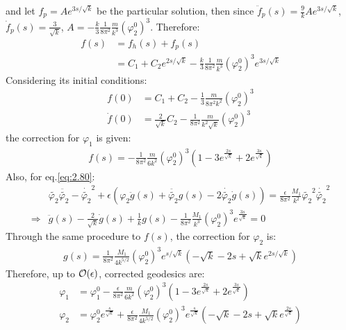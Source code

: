 and let $f_{p} = A e^{3s/ \sqrt{k}}$ be the particular solution, then since $\ddot f_{p} (s) = \frac{9}{k} Ae^{3s/\sqrt{k}}$, $\dot f_{p} (s) = \frac{3}{\sqrt{k}}$, $A = -\frac{k}{3} \frac{1}{8\pi^{2}}\frac{m}{k^{3}} (\varphi_{2}^{0})^{3}$. Therefore:
\begin{align}
    f(s) &= f_{h}(s) + f_{p}(s) \nonumber \\
    &= C_{1} + C_{2} e^{2s/\sqrt{k}} - \frac{k}{3}\frac{1}{8\pi^{2}}\frac{m}{k^{3}}(\varphi_{2}^{0})^{3} e^{3s/\sqrt{k}}
\end{align}
Considering its initial conditions:
\begin{align}
    f(0) &= C_{1} + C_{2} - \frac{1}{3}\frac{m}{8\pi^{2}k^{2}}(\varphi_{2}^{0})^{3} \\
    \dot{f}(0) &= \frac{2}{\sqrt{k}}C_{2} -  \frac{1}{8\pi^{2}}\frac{m}{k^{2}\sqrt{k}}(\varphi_{2}^{0})^{3}
\end{align}
the correction for $\varphi_{1}$ is given:
\begin{align}
    f(s) = -\frac{1}{8\pi^{2}}\frac{m}{6k^{2}}(\varphi_{2}^{0})^{3}(1-3e^{\frac{2s}{\sqrt{k}}} + 2e^{\frac{3s}{\sqrt{k}}})
\end{align}
Also, for eq.\ref{eq:2.80}:
\begin{align}
    &\tilde{\varphi_{2}}\ddot{\tilde{\varphi_{2}}} -\dot{\tilde{\varphi_{2}}}^{2} + \epsilon(\varphi_{2}\ddot{g}(s) + \ddot{\tilde{\varphi_{2}}} g(s) - 2\dot{\tilde{\varphi_{2}}}\dot{g}(s)) = \frac{\epsilon}{8\pi^{2}}\frac{M_1}{k^2} \tilde{\varphi_{2}}^2 \dot{\tilde{\varphi_{2}}}^2 \\
    \Rightarrow & \ddot{g}(s) - \frac{2}{\sqrt{k}} \dot{g}(s) +\frac{1}{k}g(s) - \frac{1}{8\pi^{2}}\frac{M_{1}}{k^3} (\varphi_{2}^{0})^{3} e^{\frac{3s}{\sqrt{k}} }= 0
\end{align}
Through the same procedure to $f(s)$, the correction for $\varphi_{2}$ is:
\begin{align}
    g(s) = \frac{1}{8\pi^{2}} \frac{M_{1}}{4k^{5/2}}(\varphi_{2}^{0})^{3}e^{s/\sqrt{k}} (-\sqrt{k} - 2s +\sqrt{k} e^{2s/\sqrt{k}})
\end{align}
Therefore, up to $\order {\epsilon}$, corrected geodesics are:
\begin{align}[left=\empheqlbrace]
    \varphi_{1} &= \varphi_{1}^{0} - \frac{\epsilon}{8\pi^2} \frac{m}{6k^{2}} (\varphi_{2}^{0})^{3} (1-3e^{\frac{2s}{\sqrt{k}}} + 2e^{\frac{3s}{\sqrt{k}}}) \\
     \varphi_{2} &= \varphi_{2}^{0} e^{\frac{s}{\sqrt{k}}} + \frac{\epsilon}{8\pi^{2}}\frac{M_{1}}{4k^{5/2}} (\varphi_{2}^{0})^{3} e^{\frac{s}{\sqrt{k}}} (-\sqrt{k} - 2s + \sqrt{k} e^{\frac{2s}{\sqrt{k}}})
\end{align}
